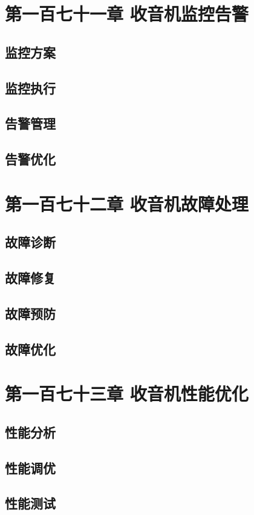 \documentclass[12pt,UTF8]{ctexbook}
\begin{document}
\chapter{第一百七十一章 收音机监控告警}

\section{监控方案}
\section{监控执行}
\section{告警管理}
\section{告警优化}

\chapter{第一百七十二章 收音机故障处理}

\section{故障诊断}
\section{故障修复}
\section{故障预防}
\section{故障优化}

\chapter{第一百七十三章 收音机性能优化}

\section{性能分析}
\section{性能调优}
\section{性能测试}
\end{document}
